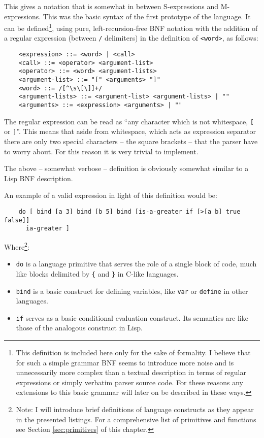 This gives a notation that is somewhat in between S-expressions and
M-expressions. This was the basic syntax of the first prototype of the
language. It can be defined\footnote{This definition is included here only for
  the sake of formality. I believe that for such a simple grammar BNF seems to
  introduce more noise and is unnecessarily more complex than a textual
  description in terms of regular expressions or simply verbatim parser source
  code. For these reasons any extensions to this basic grammar will later on be
  described in these ways.}, using pure, left-recursion-free BNF notation with
the addition of a regular expression (between \texttt{/} delimiters) in the
definition of \texttt{<word>}, as follows:
\begin{lstlisting}
    <expression> ::= <word> | <call>
    <call> ::= <operator> <argument-list>
    <operator> ::= <word> <argument-lists>
    <argument-list> ::= "[" <arguments> "]"
    <word> ::= /[^\s\[\]]+/
    <argument-lists> ::= <argument-list> <argument-lists> | ""
    <arguments> ::= <expression> <arguments> | ""
\end{lstlisting}

The regular expression can be read as ``any character which is not whitespace,
\texttt{[} or \texttt{]}''. This means that aside from whitespace, which acts as
expression separator there are only two special characters -- the square
brackets -- that the parser have to worry about. For this reason it is very
trivial to implement.

The above -- somewhat verbose -- definition is obviously somewhat similar to a
Lisp BNF
description\cite{lisp_bnf_1, lisp_bnf_2}.

An example of a valid expression in light of this definition would be:
\begin{lstlisting}
    do [ bind [a 3] bind [b 5] bind [is-a-greater if [>[a b] true false]]
      ia-greater ]
\end{lstlisting}

Where\footnote{Note: I will introduce brief definitions of language constructs
  as they appear in the presented listings. For a comprehensive list of
  primitives and functions see Section \ref{sec:primitives} of this chapter.}:
\begin{itemize}
    \item \texttt{do} is a language primitive that serves the role of a single
      block of code, much like blocks delimited by \texttt{\{} and \texttt{\}}
      in C-like languages.
    \item \texttt{bind} is a basic construct for defining variables, like
      \texttt{var} or \texttt{define} in other languages.
    \item \texttt{if} serves as a basic conditional evaluation construct. Its
      semantics are like those of the analogous construct in Lisp.
\end{itemize}

